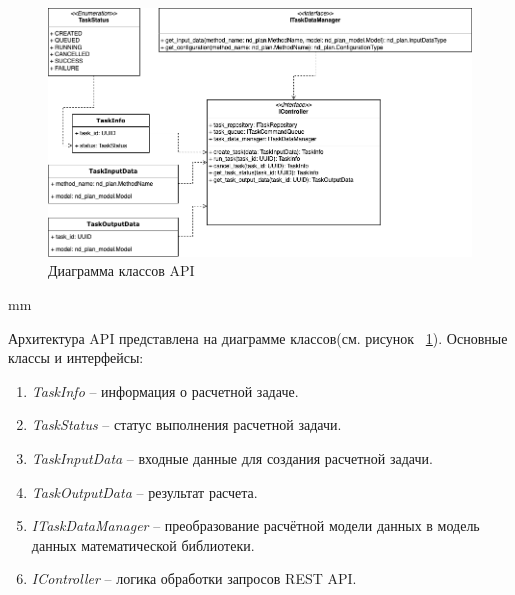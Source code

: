 \begin{figure}[H]
	\includegraphics[width=\textwidth]{architecture/pictures/executor/api_classes_diagram}
	\caption{Диаграмма классов API}
	\label{pic:architecture__api-classes-diagram}
\end{figure}
 mm

Архитектура API представлена на диаграмме классов(см. рисунок \ \ref{pic:architecture__api-classes-diagram}).
Основные классы и интерфейсы:
\begin{enumerate}
	\item \textit{TaskInfo} -- информация о расчетной задаче.
	\item \textit{TaskStatus} -- статус выполнения расчетной задачи.
	\item \textit{TaskInputData} -- входные данные для создания расчетной задачи.
	\item \textit{TaskOutputData} -- результат расчета.
	\item \textit{ITaskDataManager} -- преобразование расчётной модели данных в модель данных математической библиотеки.
	\item \textit{IController} -- логика обработки запросов REST API.
\end{enumerate}